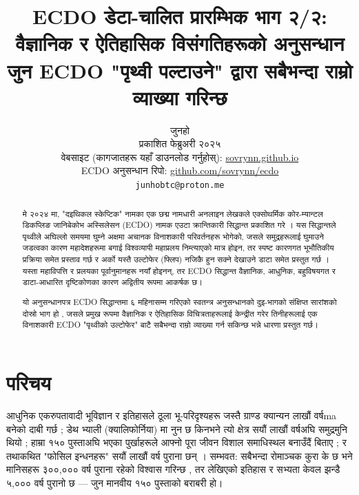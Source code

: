 \documentclass[10pt,twocolumn,letterpaper]{article}
\begin{document}
\title{ECDO डेटा-चालित प्रारम्भिक भाग २/२: वैज्ञानिक र ऐतिहासिक विसंगतिहरूको अनुसन्धान जुन ECDO "पृथ्वी पल्टाउने" द्वारा सबैभन्दा राम्रो व्याख्या गरिन्छ}

\author{जुनहो\\
प्रकाशित फेब्रुअरी २०२५\\
वेबसाइट (कागजातहरू यहाँ डाउनलोड गर्नुहोस्): \href{https://sovrynn.github.io}{sovrynn.github.io}\\
ECDO अनुसन्धान रिपो: \href{https://github.com/sovrynn/ecdo}{github.com/sovrynn/ecdo}\\
{\tt\small junhobtc@proton.me}
}

\maketitle

\begin{abstract}
मे २०२४ मा, "दइथिकल स्केप्टिक" नामका एक छद्म नामधारी अनलाइन लेखकले एक्सोथर्मिक कोर-म्यान्टल डिकप्लिङ जानिबेकोभ अस्सिलेसन (ECDO) नामक एउटा क्रान्तिकारी सिद्धान्त प्रकाशित गरे \cite{0}। यस सिद्धान्तले पृथ्वीले अघिल्लो समयमा घुम्ने अक्षमा अचानक विनाशकारी परिवर्तनहरू भोगेको, जसले समुद्रहरूलाई घुमाउने जडत्वका कारण महादेशहरूमा बगाई विश्वव्यापी महाप्रलय निम्त्याएको मात्र होइन, तर स्पष्ट कारणगत भूभौतिकीय प्रक्रिया समेत प्रस्ताव गर्छ र अर्को यस्तै उल्टोफेर (फ्लिप) नजिकै हुन सक्ने देखाउने डाटा समेत प्रस्तुत गर्छ \cite{1}। यस्ता महाविपत्ति र प्रलयका पूर्वानुमानहरू नयाँ होइनन्, तर ECDO सिद्धान्त वैज्ञानिक, आधुनिक, बहुविषयगत र डाटा-आधारित दृष्टिकोणका कारण अद्वितीय रूपमा आकर्षक छ।

यो अनुसन्धानपत्र ECDO सिद्धान्तमा ६ महिनासम्म गरिएको स्वतन्त्र अनुसन्धानको दुइ-भागको संक्षिप्त सारांशको दोस्रो भाग हो \cite{2,20}, जसले प्रमुख रूपमा वैज्ञानिक र ऐतिहासिक विचित्रताहरूलाई केन्द्रीत गरेर तिनीहरूलाई एक विनाशकारी ECDO "पृथ्वीको उल्टोफेर" बाटै सबैभन्दा राम्रो व्याख्या गर्न सकिन्छ भन्ने धारणा प्रस्तुत गर्छ।

\end{abstract}

\section{परिचय}

आधुनिक एकरुपतावादी भूविज्ञान र इतिहासले ठूला भू-परिदृश्यहरू जस्तै ग्राण्ड क्यान्यन लाखौं वर्षma बनेको दाबी गर्छ \cite{143}; डेथ भ्याली (क्यालिफोर्निया) मा नुन छ किनभने त्यो क्षेत्र सयौं लाखौं वर्षअघि समुद्रमुनि थियो \cite{144}; हाम्रा १५० पुस्ताअघि भएका पुर्खाहरूले आफ्नो पूरा जीवन विशाल समाधिस्थल बनाउँदैं बिताए \cite{29,70}; र तथाकथित "फोसिल इन्धनहरू" सयौं लाखौं वर्ष पुराना छन् \cite{104}। सम्भवत: सबैभन्दा रोमाञ्चक कुरा के छ भने मानिसहरू ३००,००० वर्ष पुराना रहेको विश्वास गरिन्छ \cite{145}, तर लेखिएको इतिहास र सभ्यता केवल झन्डै ५,००० वर्ष पुरानो छ — जुन मानवीय १५० पुस्ताको बराबरी हो।
\end{document}
